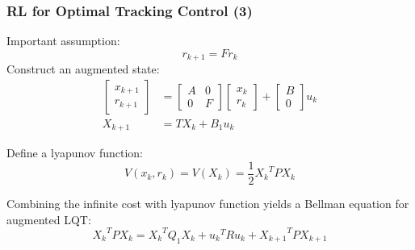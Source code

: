 \documentclass{beamer}
\begin{document}
			\begin{frame}\frametitle{RL for Optimal Tracking Control (3)}
				\vspace{3mm}
				\fontsize{8}{4}\selectfont
				Important assumption:
				\begin{equation}
				r_{k+1} = Fr_k
				\end{equation}
				Construct an augmented state:
				\begin{equation}
				\begin{split}
				\left[ \begin{array}{c}
				x_{k+1} \\ 
				r_{k+1}
				\end{array} \right] &= \left[\begin{array}{cc}
				A & \text{0} \\ 
				\text{0} & F
				\end{array}  \right] \left[ \begin{array}{c}
				x_k \\ 
				r_k
				\end{array} \right] + \left[ \begin{array}{c}
				B \\ 
				\text{0}
				\end{array} \right] u_k \\
				X_{k+1} &= TX_k + B_1u_k
				\end{split}
				\end{equation}
				\begin{definition}
					\fontsize{8}{4}\selectfont
					Define a lyapunov function:
					\begin{equation}
					V(x_k, r_k) = V(X_k) = \frac{1}{2}{X_k}^TPX_k
					\end{equation}
				\end{definition}
				\vspace{3mm}
				\fontsize{8}{4}\selectfont
				Combining the infinite cost with lyapunov function yields a Bellman equation for augmented LQT: 
				\begin{equation}
				{X_k}^TPX_k =  {X_k}^TQ_1X_k + {u_k}^TRu_k + {X_{k+1}}^TPX_{k+1}
				\end{equation}
			\end{frame}
			
\end{document}
